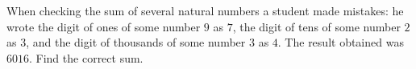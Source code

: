 When checking the sum of several natural numbers a student made mistakes: he wrote the digit of ones of some number $9$ as $7$, the digit of tens of some number $2$ as $3$, and the digit of thousands of some number $3$ as $4$. The result obtained was $6016$. Find the correct sum.
